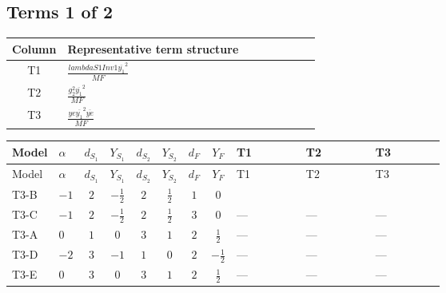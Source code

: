\documentclass[8pt]{article}
\begin{document}
\begin{landscape}
\subsection*{Terms 1 of 2}
\begin{center}
\begin{tabular}{@{}c >{\raggedright\arraybackslash}p{0.82\linewidth}@{}}
\toprule
Column & Representative term structure \\
\midrule
T1 & \(\displaystyle \frac{lambdaS1Inv1 \overline{y_{1}}^{2}}{MF}\) \\
\midrule
T2 & \(\displaystyle \frac{g_{2}^{2} \overline{y_{1}}^{2}}{MF}\) \\
\midrule
T3 & \(\displaystyle \frac{ye \overline{y_{1}}^{2} \overline{ye}}{MF}\) \\
\midrule
\bottomrule
\end{tabular}
\end{center}
\smallskip
\tiny
\begin{longtable}{@{}llcccccc >{\raggedright\arraybackslash}p{0.21\linewidth} >{\raggedright\arraybackslash}p{0.21\linewidth} >{\raggedright\arraybackslash}p{0.21\linewidth}@{}}
\toprule
Model & $\alpha$ & $d_{S_1}$ & $Y_{S_1}$ & $d_{S_2}$ & $Y_{S_2}$ & $d_F$ & $Y_F$ & T1 & T2 & T3 \\
\midrule
\endfirsthead
\toprule
Model & $\alpha$ & $d_{S_1}$ & $Y_{S_1}$ & $d_{S_2}$ & $Y_{S_2}$ & $d_F$ & $Y_F$ & T1 & T2 & T3 \\
\midrule
\endhead
T3-B & $-1$ & $2$ & $-\frac{1}{2}$ & $2$ & $\frac{1}{2}$ & $1$ & $0$ & \scriptsize\adjustbox{max width=\linewidth}{$\begin{gathered} \frac{lambdaS1Inv1 \overline{y_{1}}^{2}}{2 MF}\end{gathered}$} & \scriptsize\adjustbox{max width=\linewidth}{$\begin{gathered} \frac{3 g_{2}^{2} \overline{y_{1}}^{2}}{4 MF}\end{gathered}$} & \scriptsize\adjustbox{max width=\linewidth}{$\begin{gathered} - \frac{ye \overline{y_{1}}^{2} \overline{ye}}{4 MF}\end{gathered}$} \\
\midrule
T3-C & $-1$ & $2$ & $-\frac{1}{2}$ & $2$ & $\frac{1}{2}$ & $3$ & $0$ & --- & --- & --- \\
\midrule
T3-A & $0$ & $1$ & $0$ & $3$ & $1$ & $2$ & $\frac{1}{2}$ & --- & --- & --- \\
\midrule
T3-D & $-2$ & $3$ & $-1$ & $1$ & $0$ & $2$ & $-\frac{1}{2}$ & --- & --- & --- \\
\midrule
T3-E & $0$ & $3$ & $0$ & $3$ & $1$ & $2$ & $\frac{1}{2}$ & --- & --- & --- \\
\midrule
\bottomrule
\end{longtable}
\clearpage

\end{landscape}
\end{document}
